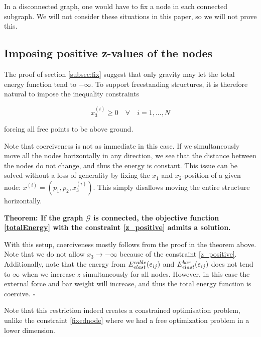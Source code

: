 
In a disconnected graph, one would have to fix a node in each connected subgraph. We will not consider these situations in this paper, so we will not prove this.

\subsection{Imposing positive z-values of the nodes}\label{subsec:fix2}
The proof of section \ref{subsec:fix} suggest that only gravity may let the total energy function tend to $-\infty$. To support freestanding structures, it is therefore natural to impose the inequality constraints

\begin{equation}
    x_3^{(i)} \geq 0 \quad \forall \quad i = 1,...,N
    \label{z_positive}
\end{equation}

forcing all free points to be above ground.

Note that coerciveness is not as immediate in this case. If we simultaneously move all the nodes horizontally in any direction, we see that the distance between the nodes do not change, and thus the energy is constant. This issue can be solved without a loss of generality by fixing the $x_1$ and $x_2$-position of a given node: $x^{(i)} = (p_1,p_2,x^{(i)}_3)$. This simply disallows moving the entire structure horizontally.

\textbf{Theorem: If the graph $\mathcal{G}$ is connected, the objective function \eqref{totalEnergy} with the constraint \eqref{z_positive} admits a solution.}

With this setup, coerciveness mostly follows from the proof in the theorem above. Note that we do not allow $x_3 \to -\infty$ because of the constraint \eqref{z_positive}. Additionally, note that the energy from $E^{cable}_{elast}(e_{ij})$ and $E^{bar}_{elast}(e_{ij})$ does not tend to $\infty$ when we increase $z$ simultaneously for all nodes. However, in this case the external force and bar weight will increase, and thus the total energy function is coercive. \hfill $\square$

Note that this restriction indeed creates a constrained optimisation problem, unlike the constraint \eqref{fixednode} where we had a free optimization problem in a lower dimension.